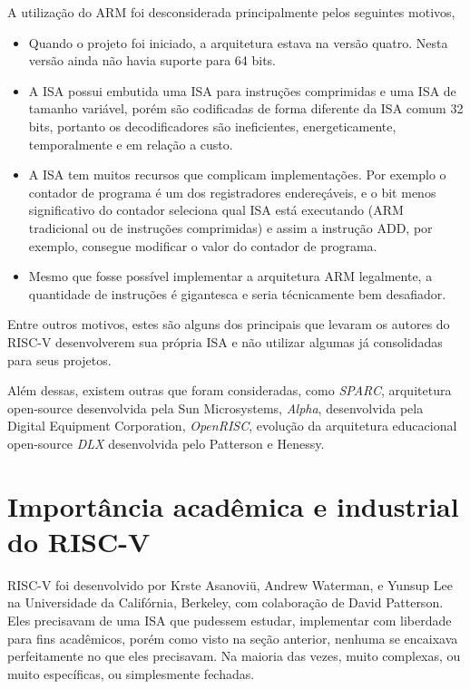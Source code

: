 		A utilização do ARM foi desconsiderada principalmente pelos seguintes motivos,
		\begin{itemize}
			\item Quando o projeto foi iniciado, a arquitetura estava na versão quatro. Nesta versão ainda não havia suporte para 64 bits.

			\item A ISA possui embutida uma ISA para instruções comprimidas e uma ISA de tamanho variável, porém são codificadas de forma diferente da ISA comum 32 bits, portanto os decodificadores são ineficientes, energeticamente, temporalmente e em relação a custo.

			\item A ISA tem muitos recursos que complicam implementações. Por exemplo o contador de programa é um dos registradores endereçáveis, e o bit menos significativo do contador seleciona qual ISA está executando (ARM tradicional ou de instruções comprimidas) e assim a instrução ADD, por exemplo, consegue modificar o valor do contador de programa. 

			\item Mesmo que fosse possível implementar a arquitetura ARM legalmente, a quantidade de instruções é gigantesca e seria técnicamente bem desafiador.   

		\end{itemize}
		Entre outros motivos, estes são alguns dos principais que levaram os autores do RISC-V desenvolverem sua própria ISA e não utilizar algumas já consolidadas para seus projetos.

		Além dessas, existem outras que foram consideradas, como \textit{SPARC}, arquitetura open-source desenvolvida pela Sun Microsystems, \textit{Alpha}, desenvolvida pela Digital Equipment Corporation, \textit{OpenRISC}, evolução da arquitetura educacional open-source \textit{DLX} desenvolvida pelo Patterson e Henessy.

	\section{Importância acadêmica e industrial do RISC-V}

		RISC-V foi desenvolvido por Krste Asanoviü, Andrew Waterman, e Yunsup Lee na Universidade da Califórnia, Berkeley, com colaboração de David Patterson. Eles precisavam de uma ISA que pudessem estudar, implementar com liberdade para fins acadêmicos, porém como visto na seção anterior, nenhuma se encaixava perfeitamente no que eles precisavam. Na maioria das vezes, muito complexas, ou muito específicas, ou simplesmente fechadas.

